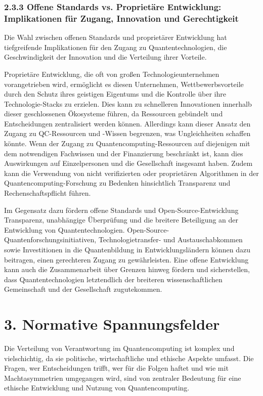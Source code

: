 \subsubsection{2.3.3 Offene Standards vs. Proprietäre Entwicklung: Implikationen für Zugang, Innovation und Gerechtigkeit}
Die Wahl zwischen offenen Standards und proprietärer Entwicklung hat tiefgreifende Implikationen für den Zugang zu Quantentechnologien, die Geschwindigkeit der Innovation und die Verteilung ihrer Vorteile.

Proprietäre Entwicklung, die oft von großen Technologieunternehmen vorangetrieben wird, ermöglicht es diesen Unternehmen, Wettbewerbsvorteile durch den Schutz ihres geistigen Eigentums und die Kontrolle über ihre Technologie-Stacks zu erzielen. Dies kann zu schnelleren Innovationen innerhalb dieser geschlossenen Ökosysteme führen, da Ressourcen gebündelt und Entscheidungen zentralisiert werden können. Allerdings kann dieser Ansatz den Zugang zu QC-Ressourcen und -Wissen begrenzen, was Ungleichheiten schaffen könnte. Wenn der Zugang zu Quantencomputing-Ressourcen auf diejenigen mit dem notwendigen Fachwissen und der Finanzierung beschränkt ist, kann dies Auswirkungen auf Einzelpersonen und die Gesellschaft insgesamt haben. Zudem kann die Verwendung von nicht verifizierten oder proprietären Algorithmen in der Quantencomputing-Forschung zu Bedenken hinsichtlich Transparenz und Rechenschaftspflicht führen.

Im Gegensatz dazu fördern offene Standards und Open-Source-Entwicklung Transparenz, unabhängige Überprüfung und die breitere Beteiligung an der Entwicklung von Quantentechnologien. Open-Source-Quantenforschungsinitiativen, Technologietransfer- und Austauschabkommen sowie Investitionen in die Quantenbildung in Entwicklungsländern können dazu beitragen, einen gerechteren Zugang zu gewährleisten. Eine offene Entwicklung kann auch die Zusammenarbeit über Grenzen hinweg fördern und sicherstellen, dass Quantentechnologien letztendlich der breiteren wissenschaftlichen Gemeinschaft und der Gesellschaft zugutekommen.


\section{3. Normative Spannungsfelder  }
Die Verteilung von Verantwortung im Quantencomputing ist komplex und vielschichtig, da sie politische, wirtschaftliche und ethische Aspekte umfasst. Die Fragen, wer Entscheidungen trifft, wer für die Folgen haftet und wie mit Machtasymmetrien umgegangen wird, sind von zentraler Bedeutung für eine ethische Entwicklung und Nutzung von Quantencomputing.



